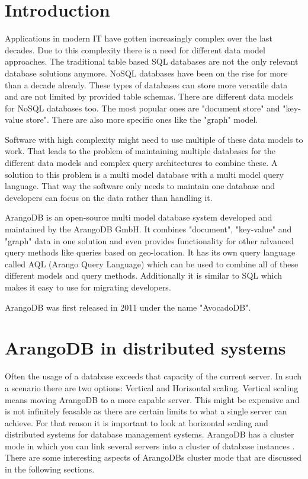 
\section{Introduction}
Applications in modern IT have gotten increasingly complex over the last decades. Due to this complexity there is a need for different data model approaches. The traditional table based SQL databases are not the only relevant database solutions anymore. NoSQL databases have been on the rise for more than a decade already. These types of databases can store more versatile data and are not limited by provided table schemas. There are different data models for NoSQL databases too. The most popular ones are "document store" and "key-value store". There are also more specific ones like the "graph" model.

Software with high complexity might need to use multiple of these data models to work. That leads to the problem of maintaining multiple databases for the different data models and complex query architectures to combine these. A solution to this problem is a multi model database with a multi model query language. That way the software only needs to maintain one database and developers can focus on the data rather than handling it.

ArangoDB is an open-source multi model database system developed and maintained by the ArangoDB GmbH. It combines "document", "key-value" and "graph" data in one solution and even provides functionality for other advanced query methods like queries based on geo-location. It has its own query language called AQL (Arango Query Language) which can be used to combine all of these different models and query methods. Additionally it is similar to SQL which makes it easy to use for migrating developers.

ArangoDB was first released in 2011 under the name "AvocadoDB". 

\parencite{ArangoHomepage}

\section{ArangoDB in distributed systems}
Often the usage of a database exceeds that capacity of the current server. In such a scenario there are two options: Vertical and Horizontal scaling. Vertical scaling means moving ArangoDB to a more capable server. This might be expensive and is not infinitely feasable as there are certain limits to what a single server can achieve. For that reason it is important to look at horizontal scaling and distributed systems for database management systems. ArangoDB has a cluster mode in which you can link several servers into a cluster of database instances \cite{ArangoCluster}. There are some interesting aspects of ArangoDBs cluster mode that are discussed in the following sections.

